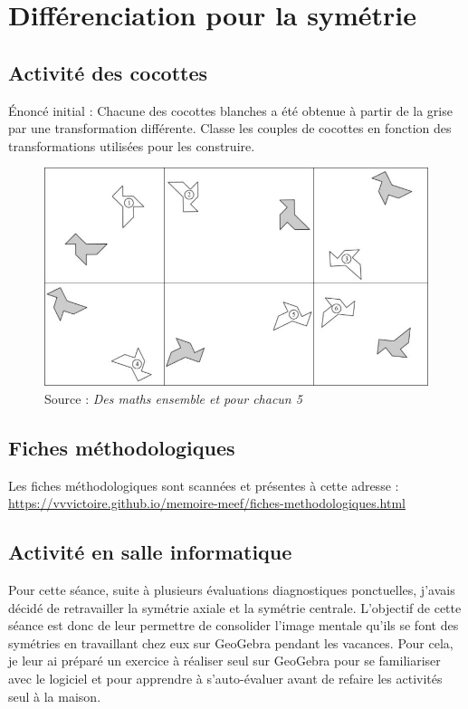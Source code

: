 \section{Différenciation pour la symétrie}

\subsection{Activité des cocottes}\label{annexe:symetrie-act}

Énoncé initial : Chacune des cocottes blanches a été obtenue à partir de la grise par une transformation différente.  Classe les couples de cocottes en fonction des transformations utilisées pour les construire.

\begin{figure}[h!]
    \centering
    \includegraphics[width=0.9\linewidth]{img/activitemepcc.jpg}
    \caption{Source : \textit{Des maths ensemble et pour chacun 5}}
    \label{fig:angles-fiche1}
\end{figure}

\subsection{Fiches méthodologiques}\label{annexe:symetrie-fiches}

Les fiches méthodologiques sont scannées et présentes à cette adresse : \url{https://vvvictoire.github.io/memoire-meef/fiches-methodologiques.html}

\subsection{Activité en salle informatique}\label{annexe:symetrie-tice}

Pour cette séance, suite à plusieurs évaluations diagnostiques ponctuelles, j'avais décidé de retravailler la symétrie axiale et la symétrie centrale. L'objectif de cette séance est donc de leur permettre de consolider l'image mentale qu'ils se font des symétries en travaillant chez eux sur GeoGebra pendant les vacances. Pour cela, je leur ai préparé un exercice à réaliser seul sur GeoGebra pour se familiariser avec le logiciel et pour apprendre à s'auto-évaluer avant de refaire les activités seul à la maison.


